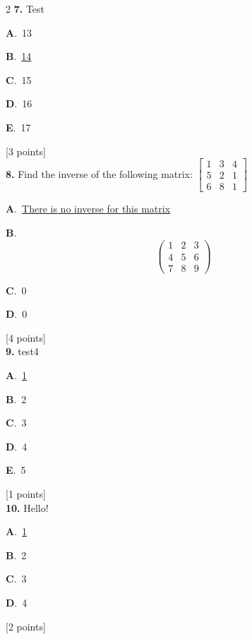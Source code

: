 \documentclass[12pt]{article}
\newcommand{\choice}[3]{%
  \noindent\textbf{#1}.~#2\hfill#3\par\vspace{0.25em}
}
\begin{document}
\begin{multicols}{2}
\noindent \textbf{\textenglish{7.}} {\textenglish{Test}}

\noindent\choice{A}{{\textenglish{13}}}{}
\noindent\choice{B}{\underline{{\textenglish{14}}}}{}
\noindent\choice{C}{{\textenglish{15}}}{}
\noindent\choice{D}{{\textenglish{16}}}{}
\noindent\choice{E}{{\textenglish{17}}}{}
\hfill {\textenglish{[3 points]}}\\[0.5em]

\noindent \textbf{\textenglish{8.}} {\textenglish{Find the inverse of the following matrix: }}\(\begin{bmatrix} 1 & 3 & 4 \\ 5 & 2 & 1 \\ 6 & 8 & 1 \end{bmatrix}\)

\noindent\choice{A}{\underline{{\textenglish{There is no inverse for this matrix}}}}{}
\noindent\choice{B}{\[\begin{pmatrix} 1 & 2 & 3 \\ 4 & 5 & 6 \\ 7 & 8 & 9  \end{pmatrix}\]}{}
\noindent\choice{C}{{\textenglish{0}}}{}
\noindent\choice{D}{{\textenglish{0}}}{}
\hfill {\textenglish{[4 points]}}\\[0.5em]

\noindent \textbf{\textenglish{9.}} {\textenglish{test4}}

\noindent\choice{A}{\underline{{\textenglish{1}}}}{}
\noindent\choice{B}{{\textenglish{2}}}{}
\noindent\choice{C}{{\textenglish{3}}}{}
\noindent\choice{D}{{\textenglish{4}}}{}
\noindent\choice{E}{{\textenglish{5}}}{}
\hfill {\textenglish{[1 points]}}\\[0.5em]

\noindent \textbf{\textenglish{10.}} {\textenglish{Hello!}}

\noindent\choice{A}{\underline{{\textenglish{1}}}}{}
\noindent\choice{B}{{\textenglish{2}}}{}
\noindent\choice{C}{{\textenglish{3}}}{}
\noindent\choice{D}{{\textenglish{4}}}{}
\hfill {\textenglish{[2 points]}}\\[0.5em]


\end{multicols}
\end{document}
